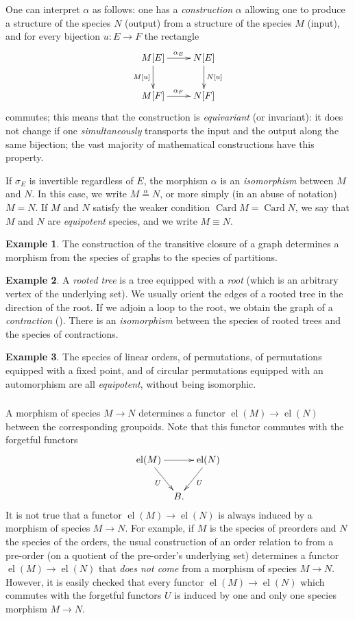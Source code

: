 \documentclass{amsart}
\theoremstyle{definition}
\newtheorem{ex}{Example}
\theoremstyle{remark}
\DeclareMathOperator{\el}{el}
\DeclareMathOperator{\Card}{Card}
\newcommand{\pref}[1]{\prettyref{#1}}
\begin{document}
One can interpret $\alpha$ as follows: one has a \emph{construction}
$\alpha$ allowing one to produce a structure of the species $N$
(output) from a structure of the species $M$ (input), and for every
bijection $u : E \to F$ the rectangle \[ \xymatrix{M[E]
  \ar[r]^{\alpha_E} \ar[d]_{M[u]} & N[E] \ar[d]^{N[u]} \\ M[F]
  \ar[r]^{\alpha_F} & N[F] } \] commutes; this means that the
construction is \emph{equivariant} (or invariant): it does not change
if one \emph{simultaneously} transports the input and the output along
the same bijection; the vast majority of mathematical constructions
have this property.

If $\sigma_E$ is invertible regardless of $E$, the morphism $\alpha$
is an \emph{isomorphism} between $M$ and $N$. In this case, we write
$M \stackrel{\alpha}{=} N$, or more simply (in an abuse of notation) $M
= N$. If $M$ and $N$ satisfy the weaker condition $\Card M = \Card N$,
we say that $M$ and $N$ are \emph{equipotent} species, and we write $M
\equiv N$.

\begin{ex}
  The construction of the transitive closure of a graph determines a
  morphism from the species of graphs to the species of partitions.
\end{ex}

\begin{ex} \label{ex:rooted-tree}
  A \emph{rooted tree} is a tree equipped with a \emph{root} (which is
  an arbitrary vertex of the underlying set). We usually orient the
  edges of a rooted tree in the direction of the root. If we adjoin a
  loop to the root, we obtain the graph of a \emph{contraction}
  (\pref{ex:endofunctions}). There is an \emph{isomorphism} between
  the species of rooted trees and the species of contractions.
\end{ex}

\begin{ex}
  The species of linear orders, of permutations, of permutations
  equipped with a fixed point, and of circular permutations equipped
  with an automorphism are all \emph{equipotent}, without being
  isomorphic.
\end{ex}

\subsubsection{} A morphism of species $M \to N$ determines a functor
$\el (M) \to \el (N)$ between the corresponding groupoids. Note that
this functor commutes with the forgetful functors \[ \xymatrix@C=0.7em{\el(M)
  \ar[rr] \ar[dr]_U & & \el(N) \ar[dl]^U \\ & B.} \]
It is not true that a functor $\el (M) \to \el (N)$ is always induced
by a morphism of species $M \to N$. For example, if $M$ is the species
of preorders and $N$ the species of the orders, the usual construction
of an order relation to from a pre-order (on a quotient of the
pre-order's underlying set) determines a functor $\el (M) \to \el (N)$
that \emph{does not come} from a morphism of species $M \to
N$. However, it is easily checked that every functor $\el (M) \to \el
(N)$ which commutes with the forgetful functors $U$ is induced by one
and only one species morphism $M \to N$.
\end{document}
